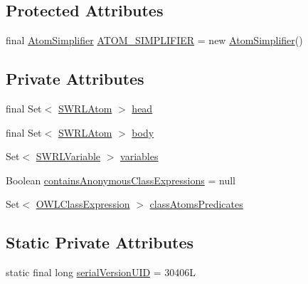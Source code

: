 \subsection*{Protected Attributes}
\begin{DoxyCompactItemize}
\item 
final \hyperlink{classuk_1_1ac_1_1manchester_1_1cs_1_1owl_1_1owlapi_1_1_s_w_r_l_rule_impl_1_1_atom_simplifier}{Atom\-Simplifier} \hyperlink{classuk_1_1ac_1_1manchester_1_1cs_1_1owl_1_1owlapi_1_1_s_w_r_l_rule_impl_aa745876ba7fa6e0ef29f5bb6c46215c6}{A\-T\-O\-M\-\_\-\-S\-I\-M\-P\-L\-I\-F\-I\-E\-R} = new \hyperlink{classuk_1_1ac_1_1manchester_1_1cs_1_1owl_1_1owlapi_1_1_s_w_r_l_rule_impl_1_1_atom_simplifier}{Atom\-Simplifier}()
\end{DoxyCompactItemize}
\subsection*{Private Attributes}
\begin{DoxyCompactItemize}
\item 
final Set$<$ \hyperlink{interfaceorg_1_1semanticweb_1_1owlapi_1_1model_1_1_s_w_r_l_atom}{S\-W\-R\-L\-Atom} $>$ \hyperlink{classuk_1_1ac_1_1manchester_1_1cs_1_1owl_1_1owlapi_1_1_s_w_r_l_rule_impl_ac89b08481b170a322e8b794e8d5380be}{head}
\item 
final Set$<$ \hyperlink{interfaceorg_1_1semanticweb_1_1owlapi_1_1model_1_1_s_w_r_l_atom}{S\-W\-R\-L\-Atom} $>$ \hyperlink{classuk_1_1ac_1_1manchester_1_1cs_1_1owl_1_1owlapi_1_1_s_w_r_l_rule_impl_a6d430d74c0cc94fc4443853bf0f675b8}{body}
\item 
Set$<$ \hyperlink{interfaceorg_1_1semanticweb_1_1owlapi_1_1model_1_1_s_w_r_l_variable}{S\-W\-R\-L\-Variable} $>$ \hyperlink{classuk_1_1ac_1_1manchester_1_1cs_1_1owl_1_1owlapi_1_1_s_w_r_l_rule_impl_ad25d611003fdc915f90fe5befc1a74ad}{variables}
\item 
Boolean \hyperlink{classuk_1_1ac_1_1manchester_1_1cs_1_1owl_1_1owlapi_1_1_s_w_r_l_rule_impl_adade8d3757e9bbd3c6f499ea12b210f4}{contains\-Anonymous\-Class\-Expressions} = null
\item 
Set$<$ \hyperlink{interfaceorg_1_1semanticweb_1_1owlapi_1_1model_1_1_o_w_l_class_expression}{O\-W\-L\-Class\-Expression} $>$ \hyperlink{classuk_1_1ac_1_1manchester_1_1cs_1_1owl_1_1owlapi_1_1_s_w_r_l_rule_impl_ae0d2d4b59d1e8b2570555ac57a0a05e4}{class\-Atoms\-Predicates}
\end{DoxyCompactItemize}
\subsection*{Static Private Attributes}
\begin{DoxyCompactItemize}
\item 
static final long \hyperlink{classuk_1_1ac_1_1manchester_1_1cs_1_1owl_1_1owlapi_1_1_s_w_r_l_rule_impl_a67e806f1a1990a78863b3354a0afebfe}{serial\-Version\-U\-I\-D} = 30406\-L
\end{DoxyCompactItemize}
